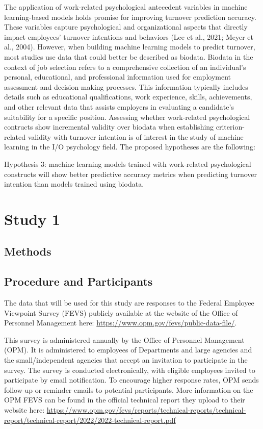 \documentclass[
  man]{apa7}
\begin{document}
The application of work-related psychological antecedent variables in machine learning-based models holds promise for improving turnover prediction accuracy.
These variables capture psychological and organizational aspects that directly impact employees' turnover intentions and behaviors (Lee et al., 2021; Meyer et al., 2004). However, when building machine learning models to predict turnover, most studies use data that could better be described as biodata. Biodata in the context of job selection refers to a comprehensive collection of an individual's personal, educational, and professional information used for employment assessment and decision-making processes. This information typically includes details such as educational qualifications, work experience, skills, achievements, and other relevant data that assists employers in evaluating a candidate's suitability for a specific position.
Assessing whether work-related psychological contructs show incremental validity over biodata when establishing criterion-related validity with turnover intention is of interest in the study of machine learning in the I/O psychology field.
The proposed hypotheses are the following:

Hypothesis 3: machine learning models trained with work-related psychological constructs will show better predictive accuracy metrics when predicting turnover intention than models trained using biodata.

\hypertarget{study-1}{%
\section{Study 1}\label{study-1}}

\hypertarget{methods}{%
\subsection{Methods}\label{methods}}

\hypertarget{procedure-and-participants}{%
\subsection{Procedure and Participants}\label{procedure-and-participants}}

The data that will be used for this study are responses to the Federal Employee Viewpoint Survey (FEVS) publicly available at the website of the Office of Personnel Management here: \url{https://www.opm.gov/fevs/public-data-file/}.

This survey is administered annually by the Office of Personnel Management (OPM). It is administered to employees of Departments and large agencies and the small/independent agencies that accept an invitation to participate in the survey. The survey is conducted electronically, with eligible employees invited to participate by email notification. To encourage higher response rates, OPM sends follow-up or reminder emails to potential participants. More information on the OPM FEVS can be found in the official technical report they upload to their website here: \url{https://www.opm.gov/fevs/reports/technical-reports/technical-report/technical-report/2022/2022-technical-report.pdf}
\end{document}
